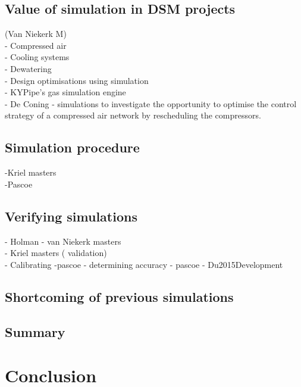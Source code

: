 	\subsection{Value of simulation in DSM projects}
		(Van Niekerk M)\\
		- Compressed air \\
		- Cooling systems\\
		- Dewatering\\
		- Design optimisations using simulation\\
 		- KYPipe’s gas simulation engine\\
		- De Coning -  simulations to investigate the opportunity to optimise the control strategy of a compressed air network by rescheduling the compressors.
	\subsection{Simulation procedure}
		-Kriel masters\\
		-Pascoe\\

 	\subsection{Verifying simulations}
 		- Holman
 		- van Niekerk masters\\
 		- Kriel masters ( validation)\\
 		- Calibrating -pascoe
 		- determining accuracy - pascoe
 		- Du2015Development
 
 	\subsection{Shortcoming of previous simulations}
	\subsection{Summary}
\section{Conclusion}